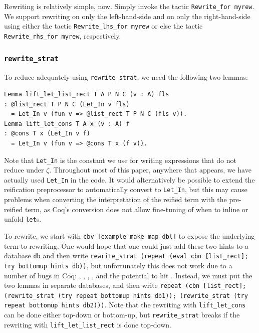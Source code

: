 \begin{subappendices}
Rewriting is relatively simple, now.
Simply invoke the tactic \texttt{Rewrite_for myrew}.
We support rewriting on only the left-hand-side and on only the right-hand-side using either the tactic \texttt{Rewrite_lhs_for myrew} or else the tactic \texttt{Rewrite_rhs_for myrew}, respectively.

\subsubsection{\texorpdfstring{\texttt{rewrite\protect\_strat}}{rewrite\_strat}}

To reduce adequately using \texttt{rewrite\_strat}, we need the following two lemmas:
\begin{verbatim}
Lemma lift_let_list_rect T A P N C (v : A) fls
: @list_rect T P N C (Let_In v fls)
  = Let_In v (fun v => @list_rect T P N C (fls v)).
Lemma lift_let_cons T A x (v : A) f
: @cons T x (Let_In v f)
  = Let_In v (fun v => @cons T x (f v)).
\end{verbatim}

Note that \texttt{Let_In} is the constant we use for writing  expressions that do not reduce under $\zeta$.
Throughout most of this paper, anywhere that  appears, we have actually used \texttt{Let_In} in the code.
It would alternatively be possible to extend the reification preprocessor to automatically convert  to \texttt{Let_In}, but this may cause problems when converting the interpretation of the reified term with the pre-reified term, as Coq's conversion does not allow fine-tuning of when to inline or unfold \texttt{let}s.

To rewrite, we start with \texttt{cbv [example make map_dbl]} to expose the underlying term to rewriting.
One would hope that one could just add these two hints to a database \texttt{db} and then write \texttt{rewrite\_strat (repeat (eval cbn [list\_rect]; try bottomup hints db))}, but unfortunately this does not work due to a number of bugs in Coq: , , , , and the potential to hit .
Instead, we must put the two lemmas in separate databases, and then write \texttt{repeat (cbn [list\_rect]; (rewrite\_strat (try repeat bottomup hints db1)); (rewrite\_strat (try repeat bottomup hints db2)))}.
Note that the rewriting with \texttt{lift_let_cons} can be done either top-down or bottom-up, but \texttt{rewrite\_strat} breaks if the rewriting with \texttt{lift_let_list_rect} is done top-down.


\end{subappendices}

